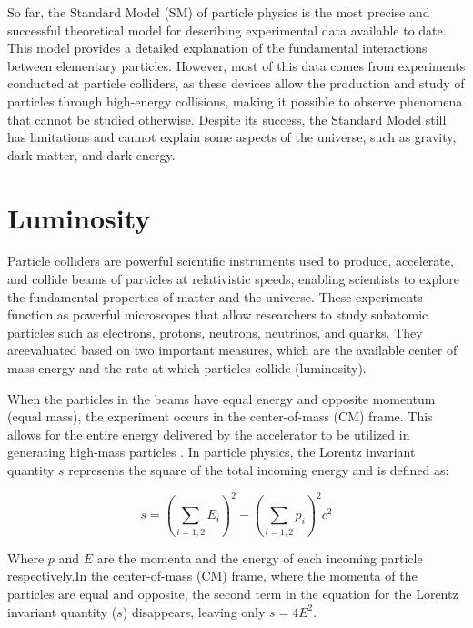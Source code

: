So far, the Standard Model (SM) of particle physics is the most precise and successful theoretical model for describing experimental data available to date. This model provides a detailed explanation of the fundamental interactions between elementary particles. However, most of this data comes from experiments conducted at particle colliders, as these devices allow the production and study of particles through high-energy collisions, making it possible to observe phenomena that cannot be studied otherwise. Despite its success, the Standard Model still has limitations and cannot explain some aspects of the universe, such as gravity, dark matter, and dark energy.


\section{Luminosity}


Particle colliders are powerful scientific instruments used to produce, accelerate, and collide beams of particles at relativistic speeds, enabling scientists to explore the fundamental properties of matter and the universe. These experiments function as powerful microscopes that allow researchers to study subatomic particles such as electrons, protons, neutrons, neutrinos, and quarks. They areevaluated based on two important measures, which are the available center of mass energy and the rate at which particles collide (luminosity).

When the particles in the beams have equal energy and opposite momentum (equal mass), the experiment occurs in the center-of-mass (CM) frame. This allows for the entire energy delivered by the accelerator to be utilized in generating high-mass particles \cite{undergraduate_accelerators_chapter}. In particle physics, the Lorentz invariant quantity $s$ represents the square of the total incoming energy and is defined as:

\begin{equation}
s = \left ( \sum_{i = 1,2}^{}E_{i} \right )^{2}-\left ( \sum_{i = 1,2}^{}p_{i} \right )^{2}c^{2}
\end{equation}

Where  \textbf{$p$} and $E$ are the momenta and the energy of each incoming particle respectively.In the center-of-mass (CM) frame, where the momenta of the particles are equal and opposite, the second term in the equation for the Lorentz invariant quantity ($s$) disappears, leaving only $s = 4E^2$.\\

